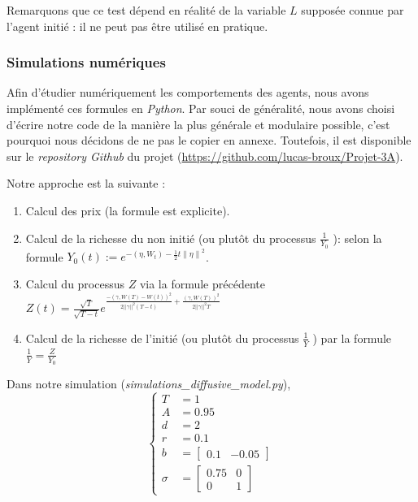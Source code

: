 \documentclass[../finalreport.tex]{subfiles}
\begin{document}
\par Remarquons que ce test dépend en réalité de la variable $L$ supposée connue par l'agent initié : il ne peut pas être utilisé en pratique.

\subsubsection{Simulations numériques}

\par Afin d'étudier numériquement les comportements des agents, nous avons implémenté ces formules en \emph{Python}. Par souci de généralité, nous avons choisi d'écrire notre code de la manière la plus générale et modulaire possible, c'est pourquoi nous décidons de ne pas le copier en annexe. Toutefois, il est disponible sur le \emph{repository Github} du projet (\url{https://github.com/lucas-broux/Projet-3A}).

\par Notre approche est la suivante : 
\begin{enumerate}
\item Calcul des prix (la formule est explicite).
\item Calcul de la richesse du non initié (ou plutôt du processus $\frac{1}{Y_0}$ ): selon la formule $ Y_0 \left( t \right) := e^{- \left( \eta, W_{t} \right)-\frac{1}{2} t {\| \eta \|}^{2}} $.
\item Calcul du processus $Z$ via la formule précédente $Z \left( t \right) = \frac{\sqrt{T}}{\sqrt{T - t}} e^{\frac{- \left( \gamma, W \left( T \right) - W \left( t \right) \right)^2}{2 ||\gamma||^2 \left( T - t \right)} + \frac{\left( \gamma, W \left( T \right) \right)^2}{2 ||\gamma||^2 T }}$
\item Calcul de la richesse de l'initié (ou plutôt du processus $\frac{1}{Y}$ ) par la formule $\frac{1}{Y} = \frac{Z}{Y_0}$ 
\end{enumerate}

\par Dans notre simulation (\emph{simulations\_diffusive\_model.py}), 
\begin{displaymath}
\begin{cases}
T &= 1 \\
A &= 0.95 \\
d &= 2 \\
r &= 0.1 \\
b &= \begin{bmatrix}
		0.1 & -0.05
	\end{bmatrix} \\
\sigma &= \begin{bmatrix}
			0.75 & 0 \\
			0 & 1
		  \end{bmatrix}
\end{cases}
\end{displaymath}
\end{document}
